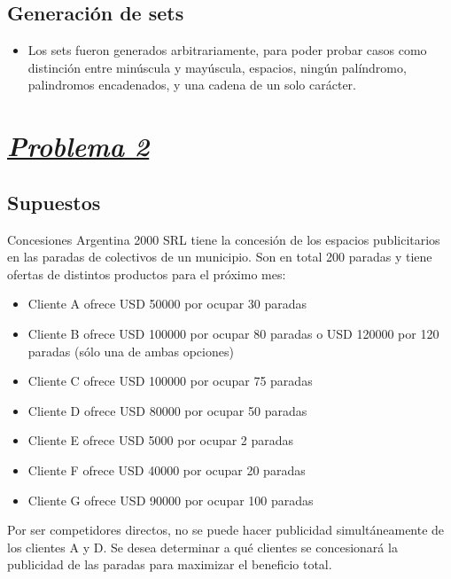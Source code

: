 \documentclass[a4paper, 12pt]{article}
\begin{document}
\subsection{Generación de sets}
\begin{itemize}
    \item Los sets fueron generados arbitrariamente, para poder probar casos como distinción entre minúscula y mayúscula, espacios, ningún palíndromo, palindromos encadenados, y una cadena de un solo carácter.
\end{itemize}

\section{{\uline{\textbf{\textit{Problema 2}}}}}
\subsection{Supuestos}
    Concesiones Argentina 2000 SRL tiene la concesión de los espacios publicitarios en las 
paradas de colectivos de un municipio. Son en total 200 paradas y tiene ofertas de distintos 
productos para el próximo mes: 
\begin{itemize}
    \item Cliente A ofrece USD 50000 por ocupar 30 paradas 
    \item Cliente B ofrece USD 100000 por ocupar 80 paradas o USD 120000 por 120 
    paradas (sólo una de ambas opciones) 
    \item Cliente C ofrece USD 100000 por ocupar 75 paradas 
    \item Cliente D ofrece USD 80000 por ocupar 50 paradas 
    \item Cliente E ofrece USD 5000 por ocupar 2 paradas 
    \item Cliente F ofrece USD 40000 por ocupar 20 paradas 
    \item Cliente G ofrece USD 90000 por ocupar 100 paradas 
\end{itemize}

    Por ser competidores directos, no se puede hacer publicidad simultáneamente de los 
clientes A y D. Se desea determinar a qué clientes se concesionará la publicidad de las 
paradas para maximizar el beneficio total. 
\end{document}
